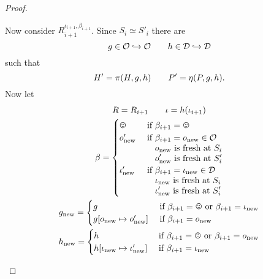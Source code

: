 \begin{proof}
\begin{description}
      Now consider $R_{i+1}^{\iota_{i+1}, \beta_{i+1}}$. Since $S_i \simeq
      S'_i$ there are
      \begin{equation*}
        g \in \mathcal{O} \hookrightarrow \mathcal{O} \quad\quad h \in \mathcal{D} \hookrightarrow \mathcal{D}
      \end{equation*}
      such that
      \begin{equation*}
        H' = \pi(H, g, h)  \quad\quad P' = \eta(P, g, h).
      \end{equation*}
      Now let 
      \begin{equation*}
        \begin{gathered}
          R = R_{i+1} \andalso \iota = h(\iota_{i+1}) \\
          \beta = 
          \begin{cases}
            \smiley         & \text{ if } \beta_{i+1} = \smiley \\
            o'_{\text{new}} & 
            \begin{aligned}[t]
              \text{ if }&\beta_{i+1} = o_{\text{new}} \in \OIDs \\
              &o_{\text{new}} \text{ is fresh at } S_i \\
              &o'_{\text{new}} \text{ is fresh at } S'_i 
            \end{aligned} \\
            \iota'_{\text{new}} & \begin{aligned}[t]
              \text{ if }&\beta_{i+1} = \iota_{\text{new}} \in \TIDs \\
              &\iota_{\text{new}} \text{ is fresh at } S_i \\
              &\iota'_{\text{new}} \text{ is fresh at } S'_i
            \end{aligned}
          \end{cases} \\
          g_{\text{new}} = 
          \begin{cases}
            g & \text{ if } \beta_{i+1} = \smiley \text{ or } \beta_{i+1} = 
            \iota_{\text{new}} \\
            g[o_{\text{new}} \mapsto o'_{\text{new}}] & \text{ if } \beta_{i+1}
            = o_{\text{new}}
          \end{cases} \\
          h_{\text{new}} = 
          \begin{cases}
            h & \text{ if } \beta_{i+1} = \smiley \text{ or } \beta_{i+1} = 
            o_{\text{new}} \\
            h[\iota_{\text{new}} \mapsto \iota'_{\text{new}}] & \text{ if } \beta_{i+1}
            = \iota_{\text{new}}
          \end{cases}
        \end{gathered}
      \end{equation*}


\end{description}
\end{proof}
